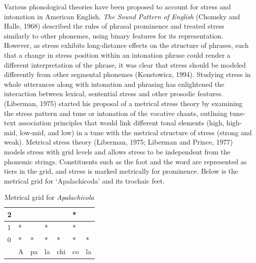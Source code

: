 \documentclass[a4paper]{article}
\begin{document}
Various phonological theories have been proposed to account for stress and intonation in American English. \textit{The Sound Pattern of English} (Chomsky and Halle, 1968) described the rules of phrasal prominence and treated stress similarly to other phonemes, using binary features for its representation. However, as stress exhibits long-distance effects on the structure of phrases, such that a change in stress position within an intonation phrase could render a different interpretation of the phrase, it was clear that stress should be modeled differently from other segmental phonemes (Kenstowicz, 1994). Studying stress in whole utterances along with intonation and phrasing has enlightened the interaction between lexical, sentential stress and other prosodic features. (Liberman, 1975) started his proposal of a metrical stress theory by examining the stress pattern and tune or intonation of the vocative chants, outlining tune-text association principles that would link different tonal elements (high, high-mid, low-mid, and low) in a tune with the metrical structure of stress (strong and weak). Metrical stress theory (Liberman, 1975; Liberman and Prince, 1977) models stress with grid levels and allows stress to be independent from the phonemic strings. Constituents such as the foot and the word are represented as tiers in the grid, and stress is marked metrically for prominence. Below is the metrical grid for `Apalachicoda' and its trochaic feet.

\begin{table}[!h]
  \begin{center}
      \caption{Metrical grid for \textit{Apalachicola}}
\begin{tabular}{lllllll}
    \label{tab:table0}
      2       &&&&&*&\\ \hline
1 & * &&  * & & *&       \\ \hline
0  & * & *       & *  & *  & *  & *          \\ \hline
       &A&pa&la&chi&co&la\\ \hline

\end{tabular}
\end{center}
\end{table}
\end{document}
